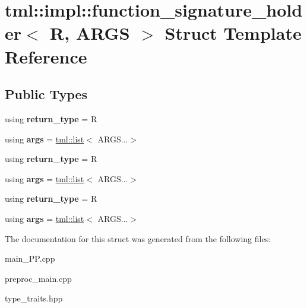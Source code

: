 \hypertarget{structtml_1_1impl_1_1function__signature__holder}{\section{tml\+:\+:impl\+:\+:function\+\_\+signature\+\_\+holder$<$ R, A\+R\+G\+S $>$ Struct Template Reference}
\label{structtml_1_1impl_1_1function__signature__holder}
}
\subsection*{Public Types}
\begin{DoxyCompactItemize}
\item 
\hypertarget{structtml_1_1impl_1_1function__signature__holder_a6fa79dc5b5611b839b29f38e0af5d632}{using {\bfseries return\+\_\+type} = R}\label{structtml_1_1impl_1_1function__signature__holder_a6fa79dc5b5611b839b29f38e0af5d632}

\item 
\hypertarget{structtml_1_1impl_1_1function__signature__holder_a49c77b960122ff55943dfba21ec5ea76}{using {\bfseries args} = \hyperlink{structtml_1_1list}{tml\+::list}$<$ A\+R\+G\+S...$>$}\label{structtml_1_1impl_1_1function__signature__holder_a49c77b960122ff55943dfba21ec5ea76}

\item 
\hypertarget{structtml_1_1impl_1_1function__signature__holder_a6fa79dc5b5611b839b29f38e0af5d632}{using {\bfseries return\+\_\+type} = R}\label{structtml_1_1impl_1_1function__signature__holder_a6fa79dc5b5611b839b29f38e0af5d632}

\item 
\hypertarget{structtml_1_1impl_1_1function__signature__holder_a49c77b960122ff55943dfba21ec5ea76}{using {\bfseries args} = \hyperlink{structtml_1_1list}{tml\+::list}$<$ A\+R\+G\+S...$>$}\label{structtml_1_1impl_1_1function__signature__holder_a49c77b960122ff55943dfba21ec5ea76}

\item 
\hypertarget{structtml_1_1impl_1_1function__signature__holder_a6fa79dc5b5611b839b29f38e0af5d632}{using {\bfseries return\+\_\+type} = R}\label{structtml_1_1impl_1_1function__signature__holder_a6fa79dc5b5611b839b29f38e0af5d632}

\item 
\hypertarget{structtml_1_1impl_1_1function__signature__holder_a49c77b960122ff55943dfba21ec5ea76}{using {\bfseries args} = \hyperlink{structtml_1_1list}{tml\+::list}$<$ A\+R\+G\+S...$>$}\label{structtml_1_1impl_1_1function__signature__holder_a49c77b960122ff55943dfba21ec5ea76}

\end{DoxyCompactItemize}


The documentation for this struct was generated from the following files\+:\begin{DoxyCompactItemize}
\item 
main\+\_\+\+P\+P.\+cpp\item 
preproc\+\_\+main.\+cpp\item 
type\+\_\+traits.\+hpp\end{DoxyCompactItemize}
